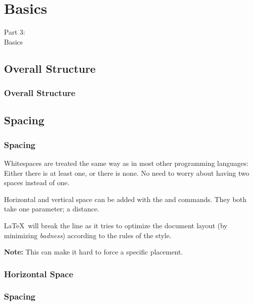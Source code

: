{
\renewcommand{\bgcolor}{basics}

\section{Basics}
\begin{frame}
  \vspace{25mm}
  \begin{center}
    \Huge{Part 3:\\Basics}
  \end{center}
\end{frame}

\subsection{Overall Structure}
\begin{frame}[fragile]
  \frametitle{Overall Structure}
  \vspace{3mm}
  
\end{frame}

\subsection{Spacing}
\begin{frame}[fragile]
  \frametitle{Spacing}
  \vspace{3mm}
  Whitespaces are treated the same way as in most other programming languages: Either there is at least one, or there is none. No need to worry about having two spaces instead of one.
  
  \vspace{5mm}
  Horizontal and vertical space can be added with the  and  commands. They both take one parameter; a distance.
  
  \vspace{5mm}
  \LaTeX\ will break the line as it tries to optimize the document layout (by minimizing \textsl{badness}) according to the rules of the style.
  
  \vspace{5mm}
  \textbf{Note:} This can make it hard to force a specific placement.
\end{frame}

\subsubsection{Horizontal Space}
\begin{frame}[fragile]
  \frametitle{Spacing }
  \vspace{3mm}
\end{frame}}
